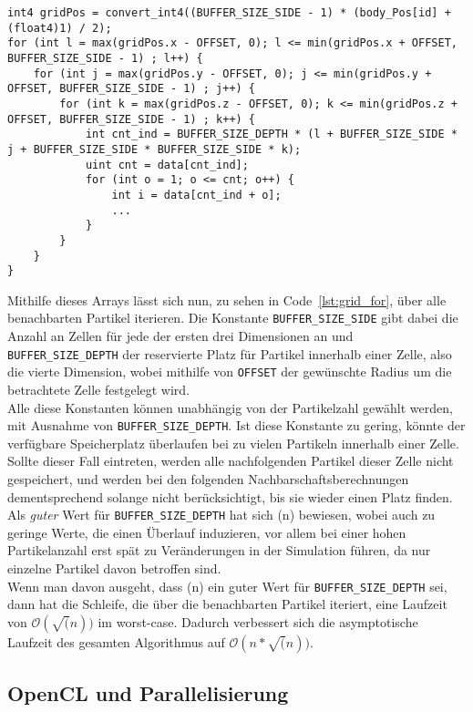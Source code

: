 \begin{minipage}{\linewidth}
\begin{lstlisting}[caption=Iteration über benachbarte Partikel, label=lst:grid_for]
int4 gridPos = convert_int4((BUFFER_SIZE_SIDE - 1) * (body_Pos[id] + (float4)1) / 2);
for (int l = max(gridPos.x - OFFSET, 0); l <= min(gridPos.x + OFFSET, BUFFER_SIZE_SIDE - 1) ; l++) {
	for (int j = max(gridPos.y - OFFSET, 0); j <= min(gridPos.y + OFFSET, BUFFER_SIZE_SIDE - 1) ; j++) {
		for (int k = max(gridPos.z - OFFSET, 0); k <= min(gridPos.z + OFFSET, BUFFER_SIZE_SIDE - 1) ; k++) {
			int cnt_ind = BUFFER_SIZE_DEPTH * (l + BUFFER_SIZE_SIDE * j + BUFFER_SIZE_SIDE * BUFFER_SIZE_SIDE * k);
			uint cnt = data[cnt_ind];			
			for (int o = 1; o <= cnt; o++) {
				int i = data[cnt_ind + o];
				...
			}
		}
	}
}
\end{lstlisting}
\end{minipage}

Mithilfe dieses Arrays lässt sich nun, zu sehen in Code~\ref{lst:grid_for}, über alle benachbarten Partikel iterieren. Die Konstante \texttt{BUFFER_SIZE_SIDE} gibt dabei die Anzahl an Zellen für jede der ersten drei Dimensionen an und \texttt{BUFFER_SIZE_DEPTH} der reservierte Platz für Partikel innerhalb einer Zelle, also die vierte Dimension, wobei mithilfe von \texttt{OFFSET} der gewünschte Radius um die betrachtete Zelle festgelegt wird.\\

Alle diese Konstanten können unabhängig von der Partikelzahl gewählt werden, mit Ausnahme von \texttt{BUFFER_SIZE_DEPTH}. Ist diese Konstante zu gering, könnte der verfügbare Speicherplatz überlaufen bei zu vielen Partikeln innerhalb einer Zelle. Sollte dieser Fall eintreten, werden alle nachfolgenden Partikel dieser Zelle nicht gespeichert, und werden bei den folgenden Nachbarschaftsberechnungen dementsprechend solange nicht berücksichtigt, bis sie wieder einen Platz finden.\\
Als \textit{guter} Wert für \texttt{BUFFER_SIZE_DEPTH} hat sich \sqrt(n) bewiesen, wobei auch zu geringe Werte, die einen Überlauf induzieren, vor allem bei einer hohen Partikelanzahl erst spät zu Veränderungen in der Simulation führen, da nur einzelne Partikel davon betroffen sind.\\
Wenn man davon ausgeht, dass \sqrt(n) ein guter Wert für \texttt{BUFFER_SIZE_DEPTH} sei, dann hat die Schleife, die über die benachbarten Partikel iteriert, eine Laufzeit von $\mathcal O(\sqrt(n))$ im worst-case. Dadurch verbessert sich die asymptotische Laufzeit des gesamten Algorithmus auf $\mathcal O(n * \sqrt(n))$.
\subsection{OpenCL und Parallelisierung}

